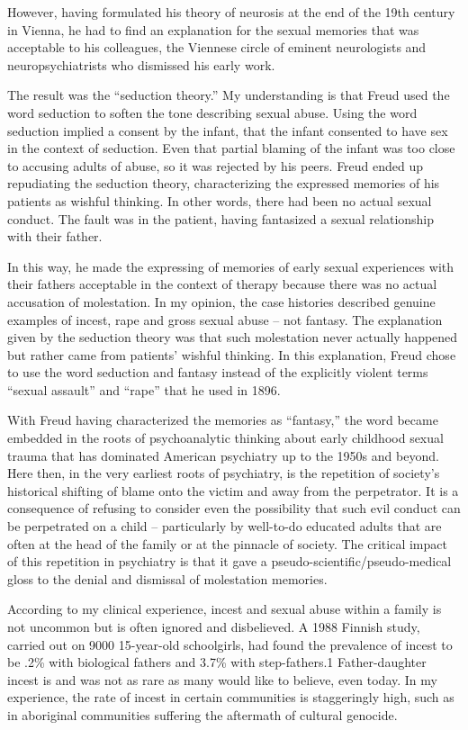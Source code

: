 \documentclass[]{book}
\begin{document}
However, having formulated his theory of neurosis at the end of the 19th century in Vienna, he had to find an explanation for the sexual memories that was acceptable to his colleagues, the Viennese circle of eminent neurologists and neuropsychiatrists who dismissed his early work.

The result was the ``seduction theory.'' My understanding is that Freud used the word seduction to soften the tone describing sexual abuse. Using the word seduction implied a consent by the infant, that the infant consented to have sex in the context of seduction. Even that partial blaming of the infant was too close to accusing adults of abuse, so it was rejected by his peers. Freud ended up repudiating the seduction theory, characterizing the expressed memories of his patients as wishful thinking. In other words, there had been no actual sexual conduct. The fault was in the patient, having fantasized a sexual relationship with their father.

In this way, he made the expressing of memories of early sexual experiences with their fathers acceptable in the context of therapy because there was no actual accusation of molestation. In my opinion, the case histories described genuine examples of incest, rape and gross sexual abuse -- not fantasy. The explanation given by the seduction theory was that such molestation never actually happened but rather came from patients' wishful thinking. In this explanation, Freud chose to use the word seduction and fantasy instead of the explicitly violent terms ``sexual assault'' and ``rape'' that he used in 1896.

With Freud having characterized the memories as ``fantasy,'' the word became embedded in the roots of psychoanalytic thinking about early childhood sexual trauma that has dominated American psychiatry up to the 1950s and beyond. Here then, in the very earliest roots of psychiatry, is the repetition of society's historical shifting of blame onto the victim and away from the perpetrator. It is a consequence of refusing to consider even the possibility that such evil conduct can be perpetrated on a child -- particularly by well-to-do educated adults that are often at the head of the family or at the pinnacle of society. The critical impact of this repetition in psychiatry is that it gave a pseudo-scientific/pseudo-medical gloss to the denial and dismissal of molestation memories.

According to my clinical experience, incest and sexual abuse within a family is not uncommon but is often ignored and disbelieved. A 1988 Finnish study, carried out on 9000 15-year-old schoolgirls, had found the prevalence of incest to be .2\% with biological fathers and 3.7\% with step-fathers.1 Father-daughter incest is and was not as rare as many would like to believe, even today. In my experience, the rate of incest in certain communities is staggeringly high, such as in aboriginal communities suffering the aftermath of cultural genocide.
\end{document}
